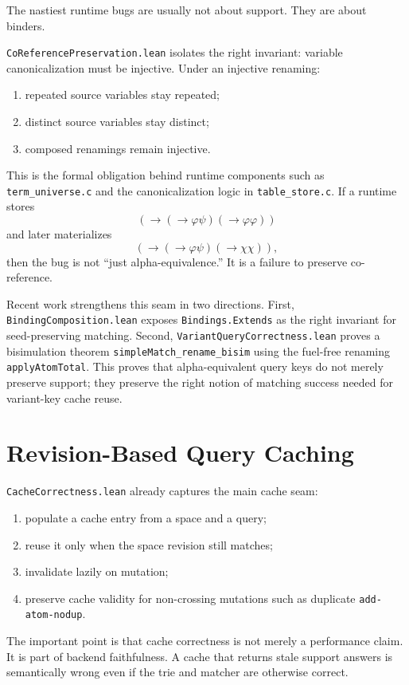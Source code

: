 \documentclass[11pt]{article}
\newcommand{\code}[1]{\texttt{#1}}
\begin{document}
The nastiest runtime bugs are usually not about support.  They are about
binders.

\code{CoReferencePreservation.lean} isolates the right invariant:
variable canonicalization must be injective.  Under an injective renaming:
\begin{enumerate}
\item repeated source variables stay repeated;
\item distinct source variables stay distinct;
\item composed renamings remain injective.
\end{enumerate}

This is the formal obligation behind runtime components such as
\code{term\_universe.c} and the canonicalization logic in
\code{table\_store.c}.  If a runtime stores
\[
(\to (\to \varphi \psi) (\to \varphi \varphi))
\]
and later materializes
\[
(\to (\to \varphi \psi) (\to \chi \chi)),
\]
then the bug is not ``just alpha-equivalence.''  It is a failure to
preserve co-reference.

Recent work strengthens this seam in two directions.  First,
\code{BindingComposition.lean} exposes \code{Bindings.Extends} as the
right invariant for seed-preserving matching.  Second,
\code{VariantQueryCorrectness.lean} proves a bisimulation theorem
\texttt{simpleMatch\_rename\_bisim} using the fuel-free renaming
\texttt{applyAtomTotal}.  This proves that alpha-equivalent query keys do
not merely preserve support; they preserve the right notion of matching
success needed for variant-key cache reuse.

\section{Revision-Based Query Caching}

\code{CacheCorrectness.lean} already captures the main cache seam:
\begin{enumerate}
\item populate a cache entry from a space and a query;
\item reuse it only when the space revision still matches;
\item invalidate lazily on mutation;
\item preserve cache validity for non-crossing mutations such as
  duplicate \code{add-atom-nodup}.
\end{enumerate}

The important point is that cache correctness is not merely a performance
claim.  It is part of backend faithfulness.  A cache that returns stale
support answers is semantically wrong even if the trie and matcher are
otherwise correct.
\end{document}

